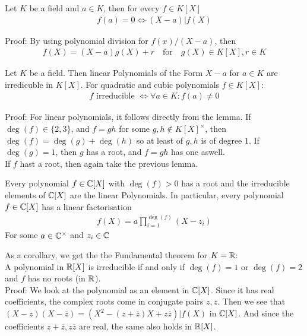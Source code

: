 \begin{lemma}[]
	Let $K$ be a field and $a \in K$, then for every $f \in K[X]$
	\begin{align*}
		f(a) = 0 \iff (X-a)|f(X)
	\end{align*}
\end{lemma}
Proof: By using polynomial division for $f(x)/(X-a)$, then 
\begin{align*}
	f(X) = (X-a)g(X) + r \quad \text{for} \quad g(X) \in K[X], r \in K
\end{align*}

\begin{proposition}[]
	Let $K$ be a field. Then linear Polynomials of the Form $X-a$ for $a \in K$ are irredicuble in $K[X]$. For quadratic and cubic polynomials $f \in K[X]$:
	\begin{align*}
		f \text{ irreducible } \iff \forall a \in K: f(a) \neq 0
	\end{align*}
\end{proposition}
Proof: For linear polynomials, it follows directly from the lemma. If $\deg(f) \in \{2,3\}$, and $f = gh$ for some $g,h \notin K[X]^{\times}$, then $\deg(f) = \deg(g) + \deg(h)$ so at least of $g,h$ is of degree $1$. If $\deg(g) = 1$, then $g$ has a root, and $f = gh$ has one aswell.\\
If $f$ hast a root, then again take the previous lemma.


\begin{ntheorem}
	Every polynomial $f \in \mathbb{C}[X]$ with $\deg(f) > 0$ has a root and the irreducible elements of $\mathbb{C}[X]$ are the linear Polynomials. In particular, every polynomial $f \in \mathbb{C}[X]$ has a linear factorisation
	\begin{align*}
		f(X) = a \prod_{i = 1}^{\deg(f)}(X - z_i)
	\end{align*}
	For some $a \in \mathbb{C}^\times$ and $z_i \in \mathbb{C}$
\end{ntheorem}

As a corollary, we get the the Fundamental theorem for $K = \mathbb{R}$:\\
A polynomial in $\mathbb{R}[X]$ is irreducible if and only if $\deg(f) = 1$ or $\deg(f) = 2$ and $f$ has no roots (in $\mathbb{R}$).\\
Proof: We look at the polynomial as an element in $\mathbb{C}[X]$. Since it has real coefficients, the complex roots come in conjugate pairs $z, \overline{z}$. Then we see that $(X-z)(X- \overline{z}) = (X^2 - (z + \overline{z})X + z \overline{z}) | f(X)$ in $\mathbb{C}[X]$. And since the coefficients $z + \overline{z}, z \overline{z}$ are real, the same also holds in $\mathbb{R}[X]$.

